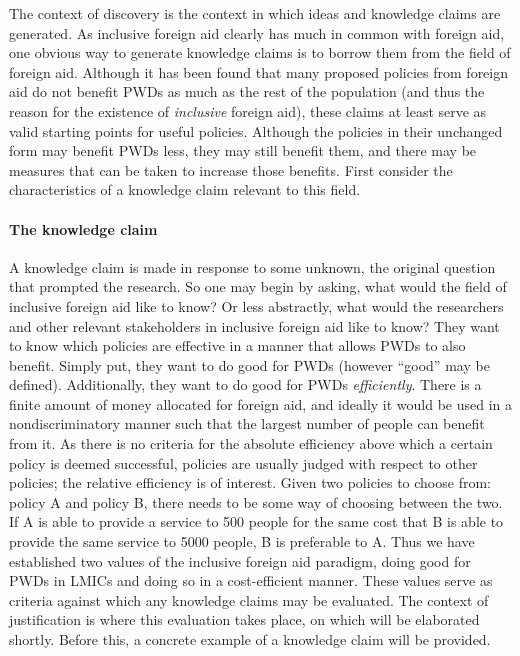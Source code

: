 \documentclass[a4paper]{article}
\begin{document}
The context of discovery is the context in which ideas and knowledge claims
are generated. As inclusive foreign aid clearly has much in common with
foreign aid, one obvious way to generate knowledge claims is to borrow them
from the field of foreign aid. Although it has been found that many proposed
policies from foreign aid do not benefit PWDs as much as the rest of the
population (and thus the reason for the existence of \emph{inclusive} foreign
aid), these claims at least serve as valid starting points for useful
policies. Although the policies in their unchanged form may benefit PWDs less,
they may still benefit them, and there may be measures that can be taken to
increase those benefits. First consider the characteristics of a knowledge
claim relevant to this field.


\paragraph{The knowledge claim}

A knowledge claim is made in response to some unknown, the original question
that prompted the research. So one may begin by asking, what would the field
of inclusive foreign aid like to know? Or less abstractly, what would the
researchers and other relevant stakeholders in inclusive foreign aid like to
know? They want to know which policies are effective in a manner that allows
PWDs to also benefit. Simply put, they want to do good for PWDs (however
``good'' may be defined). Additionally, they want to do good for PWDs
\emph{efficiently}. There is a finite amount of money allocated for foreign
aid, and ideally it would be used in a nondiscriminatory manner such that the
largest number of people can benefit from it. As there is no criteria for the
absolute efficiency above which a certain policy is deemed successful,
policies are usually judged with respect to other policies; the relative
efficiency is of interest. Given two policies to choose from: policy A and
policy B, there needs to be some way of choosing between the two. If A is able
to provide a service to 500 people for the same cost that B is able to provide
the same service to 5000 people, B is preferable to A. Thus we have
established two values of the inclusive foreign aid paradigm, doing good for
PWDs in LMICs and doing so in a cost-efficient manner. These values serve as
criteria against which any knowledge claims may be evaluated. The context of
justification is where this evaluation takes place, on which will be
elaborated shortly. Before this, a concrete example of a knowledge claim will
be provided.
\end{document}
